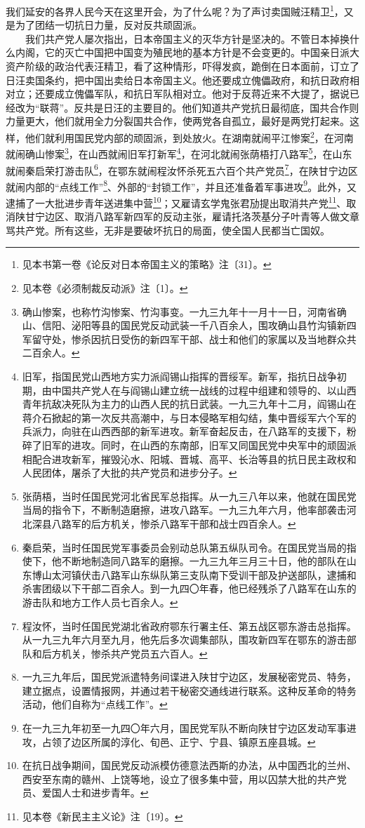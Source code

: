 \documentclass[cn,11pt,chinese]{elegantbook}
\begin{document}
我们延安的各界人民今天在这里开会，为了什么呢？为了声讨卖国贼汪精卫\footnote[1]{ 见本书第一卷《论反对日本帝国主义的策略》注〔31〕。}，又是为了团结一切抗日力量，反对反共顽固派。\\
　　我们共产党人屡次指出，日本帝国主义的灭华方针是坚决的。不管日本掉换什么内阁，它的灭亡中国把中国变为殖民地的基本方针是不会变更的。中国亲日派大资产阶级的政治代表汪精卫，看了这种情形，吓得发疯，跪倒在日本面前，订立了日汪卖国条约，把中国出卖给日本帝国主义。他还要成立傀儡政府，和抗日政府相对立；还要成立傀儡军队，和抗日军队相对立。他对于反蒋近来不大提了，据说已经改为“联蒋”。反共是日汪的主要目的。他们知道共产党抗日最彻底，国共合作则力量更大，他们就用全力分裂国共合作，使两党各自孤立，最好是两党打起来。这样，他们就利用国民党内部的顽固派，到处放火。在湖南就闹平江惨案\footnote[2]{ 见本卷《必须制裁反动派》注〔1〕。}，在河南就闹确山惨案\footnote[3]{ 确山惨案，也称竹沟惨案、竹沟事变。一九三九年十一月十一日，河南省确山、信阳、泌阳等县的国民党反动武装一千八百余人，围攻确山县竹沟镇新四军留守处，惨杀因抗日受伤的新四军干部、战士和他们的家属以及当地群众共二百余人。}，在山西就闹旧军打新军\footnote[4]{ 旧军，指国民党山西地方实力派阎锡山指挥的晋绥军。新军，指抗日战争初期，由中国共产党人在与阎锡山建立统一战线的过程中组建和领导的、以山西青年抗敌决死队为主力的山西人民的抗日武装。一九三九年十二月，阎锡山在蒋介石掀起的第一次反共高潮中，与日本侵略军相勾结，集中晋绥军六个军的兵派力，向驻在山西西部的新军进攻。新军奋起反击，在八路军的支援下，粉碎了旧军的进攻。同时，在山西的东南部，旧军又同国民党中央军中的顽固派相配合进攻新军，摧毁沁水、阳城、晋城、高平、长治等县的抗日民主政权和人民团体，屠杀了大批的共产党员和进步分子。}，在河北就闹张荫梧打八路军\footnote[5]{ 张荫梧，当时任国民党河北省民军总指挥。从一九三八年以来，他就在国民党当局的指令下，不断制造磨擦，进攻八路军。一九三九年六月，他率部袭击河北深县八路军的后方机关，惨杀八路军干部和战士四百余人。}，在山东就闹秦启荣打游击队\footnote[6]{ 秦启荣，当时任国民党军事委员会别动总队第五纵队司令。在国民党当局的指使下，他不断地制造同八路军的磨擦。一九三九年三月三十日，他的部队在山东博山太河镇伏击八路军山东纵队第三支队南下受训干部及护送部队，逮捕和杀害团级以下干部二百余人。到一九四〇年春，他已经残杀了八路军在山东的游击队和地方工作人员七百余人。}，在鄂东就闹程汝怀杀死五六百个共产党员\footnote[7]{ 程汝怀，当时任国民党湖北省政府鄂东行署主任、第五战区鄂东游击总指挥。从一九三九年六月至九月，他先后多次调集部队，围攻新四军在鄂东的游击部队和后方机关，惨杀共产党员五六百人。}，在陕甘宁边区就闹内部的“点线工作”\footnote[8]{ 一九三九年后，国民党派遣特务间谍进入陕甘宁边区，发展秘密党员、特务，建立据点，设置情报网，并通过若干秘密交通线进行联系。这种反革命的特务活动，他们自称为“点线工作”。}、外部的“封锁工作”，并且还准备着军事进攻\footnote[9]{ 在一九三九年初至一九四〇年六月，国民党军队不断向陕甘宁边区发动军事进攻，占领了边区所属的淳化、旬邑、正宁、宁县、镇原五座县城。}。此外，又逮捕了一大批进步青年送进集中营\footnote[10]{ 在抗日战争期间，国民党反动派模仿德意法西斯的办法，从中国西北的兰州、西安至东南的赣州、上饶等地，设立了很多集中营，用以囚禁大批的共产党员、爱国人士和进步青年。}；又雇请玄学鬼张君劢提出取消共产党\footnote[11]{ 见本卷《新民主主义论》注〔19〕。}、取消陕甘宁边区、取消八路军新四军的反动主张，雇请托洛茨基分子叶青等人做文章骂共产党。所有这些，无非是要破坏抗日的局面，使全国人民都当亡国奴。\\
\end{document}
